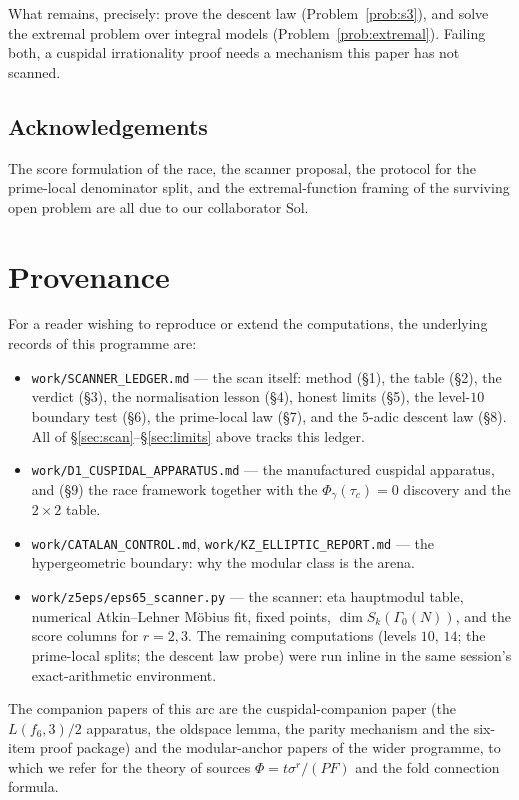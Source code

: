 \documentclass[11pt,reqno]{amsart}
\theoremstyle{plain}
\theoremstyle{definition}
\theoremstyle{remark}
\newcommand{\Ga}{\Gamma_0}
\begin{document}
What remains, precisely: prove the descent law (Problem~\ref{prob:s3}),
and solve the extremal problem over integral models
(Problem~\ref{prob:extremal}). Failing both, a cuspidal irrationality
proof needs a mechanism this paper has not scanned.

\subsection*{Acknowledgements}

The score formulation of the race, the scanner proposal, the protocol for
the prime-local denominator split, and the extremal-function framing of
the surviving open problem are all due to our collaborator Sol.

\appendix

\section{Provenance}
\label{app:prov}

For a reader wishing to reproduce or extend the computations, the
underlying records of this programme are:

\begin{itemize}[leftmargin=1.4em]
\item \texttt{work/SCANNER\_LEDGER.md} --- the scan itself: method
  (\S1), the table (\S2), the verdict (\S3), the normalisation lesson
  (\S4), honest limits (\S5), the level-$10$ boundary test (\S6), the
  prime-local law (\S7), and the $5$-adic descent law (\S8). All of
  \S\ref{sec:scan}--\S\ref{sec:limits} above tracks this ledger.
\item \texttt{work/D1\_CUSPIDAL\_APPARATUS.md} --- the manufactured
  cuspidal apparatus, and (\S9) the race framework together with the
  $\Phi_\gamma(\tau_c)=0$ discovery and the $2\times2$ table.
\item \texttt{work/CATALAN\_CONTROL.md},
  \texttt{work/KZ\_ELLIPTIC\_REPORT.md} --- the hypergeometric boundary:
  why the modular class is the arena.
\item \texttt{work/z5eps/eps65\_scanner.py} --- the scanner: eta
  hauptmodul table, numerical Atkin--Lehner M\"obius fit, fixed points,
  $\dim S_k(\Ga(N))$, and the score columns for $r=2,3$. The remaining
  computations (levels $10$, $14$; the prime-local splits; the descent
  law probe) were run inline in the same session's exact-arithmetic
  environment.
\end{itemize}

The companion papers of this arc are the cuspidal-companion paper (the
$L(f_6,3)/2$ apparatus, the oldspace lemma, the parity mechanism and the
six-item proof package) and the modular-anchor papers of the wider
programme, to which we refer for the theory of sources
$\Phi=t\sigma^r/(PF)$ and the fold connection formula.
\end{document}
